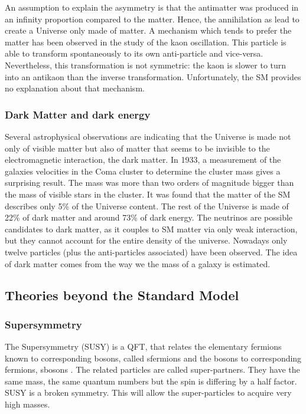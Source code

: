     An assumption to explain the asymmetry is that the antimatter was produced in an infinity proportion compared to the matter.
    Hence, the annihilation as lead to create a Universe only made of matter.
    A mechanism which tends to prefer the matter has been observed in the study of the kaon oscillation.
    This particle is able to transform spontaneously to its own anti-particle and vice-versa.
    Nevertheless, this transformation is not symmetric: the kaon is slower to turn into an antikaon than the inverse transformation.
    Unfortunately, the \gls{SM} provides no explanation about that mechanism.
 
    \subsubsection{Dark Matter and dark energy}
    
    Several astrophysical observations are indicating that the Universe is made not only of visible matter but also of matter that seems to be invisible to the electromagnetic interaction, the dark matter.
    In 1933, a measurement of the galaxies velocities in the Coma cluster to determine the cluster mass gives a surprising result.
    The mass was more than two orders of magnitude bigger than the mass of visible stars in the cluster.
    It was found that the matter of the \gls{SM} describes only 5\% of the Universe content. 
    The rest of the Universe is made of 22\% of dark matter and around 73\% of dark energy.
    The neutrinos are possible candidates to dark matter, as it couples to \gls{SM} matter via only weak interaction, but they cannot account for the entire density of the universe.
    Nowadays only twelve particles (plus the anti-particles associated) have been observed. 
    The idea of dark matter comes from the way we the mass of a galaxy is estimated.

    \subsection{Theories beyond the Standard Model}

      \subsubsection{Supersymmetry}
    
      The Supersymmetry (SUSY) is a QFT, that relates the elementary fermions known to corresponding bosons, called sfermions and the bosons to corresponding fermions, sbosons \cite{Signer2009}.
      The related particles are called super-partners.
      They have the same mass, the same quantum numbers but the spin is differing by a half factor.
      SUSY is a broken symmetry. 
      This will allow the super-particles to acquire very high masses.

